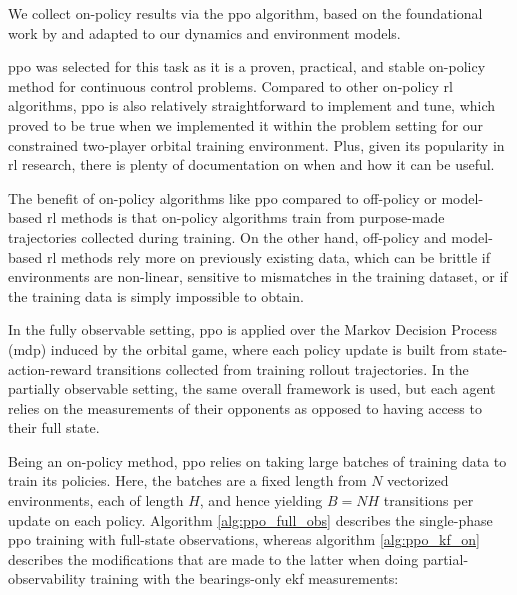 We collect on-policy results via the \acs{ppo} algorithm, based on the foundational work by \cite{schulman2017ppo} and adapted to our dynamics and environment models.

\acs{ppo} was selected for this task as it is a proven, practical, and stable on-policy method for continuous control problems. Compared to other on-policy \acs{rl} algorithms, \acs{ppo} is also relatively straightforward to implement and tune, which proved to be true when we implemented it within the problem setting for our constrained two-player orbital training environment. Plus, given its popularity in \acs{rl} research, there is plenty of documentation on when and how it can be useful.

The benefit of on-policy algorithms like \acs{ppo} compared to off-policy or model-based \acs{rl} methods is that on-policy algorithms train from purpose-made trajectories collected during training. On the other hand, off-policy and model-based \acs{rl} methods rely more on previously existing data, which can be brittle if environments are non-linear, sensitive to mismatches in the training dataset, or if the training data is simply impossible to obtain.

In the fully observable setting, \acs{ppo} is applied over the Markov Decision Process (\acs{mdp}) induced by the orbital game, where each policy update is built from state-action-reward transitions collected from training rollout trajectories. In the partially observable setting, the same overall framework is used, but each agent relies on the measurements of their opponents as opposed to having access to their full state.


Being an on-policy method, \acs{ppo} relies on taking large batches of training data to train its policies. Here, the batches are a fixed length from \(N\) vectorized environments, each of length \(H\), and hence yielding \(B=NH\) transitions per update on each policy. Algorithm \ref{alg:ppo_full_obs} describes the single-phase \acs{ppo} training with full-state observations, whereas algorithm \ref{alg:ppo_kf_on} describes the modifications that are made to the latter when doing partial-observability training with the bearings-only \acs{ekf} measurements: 



